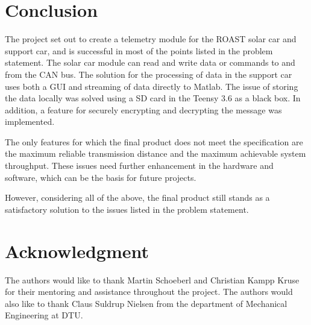 \documentclass[a4paper,conference]{IEEEtran}
\begin{document}
\section{Conclusion}
The project set out to create a telemetry module for the ROAST solar car and support car, and is successful in most of the points listed in the problem statement. The solar car module can read and write data or commands to and from the CAN bus. The solution for the processing of data in the support car uses both a GUI and streaming of data directly to Matlab. The issue of storing the data locally was solved using a SD card in the Teensy 3.6 as a black box. In addition, a feature for securely encrypting and decrypting the message was implemented.

The only features for which the final product does not meet the specification are the maximum reliable transmission distance and the maximum achievable system throughput. These issues need further enhancement in the hardware and software, which can be the basis for future projects.

However, considering all of the above, the final product still stands as a satisfactory solution to the issues listed in the problem statement.


\section*{Acknowledgment}
The authors would like to thank Martin Schoeberl and Christian Kampp Kruse for their mentoring and assistance throughout the project. The authors would also like to thank Claus Suldrup Nielsen from the department of Mechanical Engineering at DTU. 

\printbibliography
\end{document}
